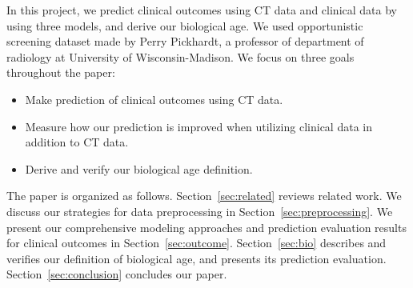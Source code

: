 In this project, we predict clinical outcomes using CT data and clinical data by using three models, and derive our biological age. We used opportunistic screening dataset made by Perry Pickhardt, a professor of department of radiology at University of Wisconsin-Madison. 
We focus on three goals throughout the paper:
\begin{itemize}[leftmargin=*]
\item Make prediction of clinical outcomes using CT data.
\item Measure how our prediction is improved when utilizing clinical data in addition to CT data.
\item Derive and verify our biological age definition.
\end{itemize}

The paper is organized as follows.
Section~\ref{sec:related} reviews related work.
We discuss our strategies for data preprocessing in Section~\ref{sec:preprocessing}.
We present our comprehensive modeling approaches and prediction evaluation results for clinical outcomes in Section~\ref{sec:outcome}.
Section~\ref{sec:bio} describes and verifies our definition of biological age, and presents its prediction evaluation.
Section~\ref{sec:conclusion} concludes our paper.
